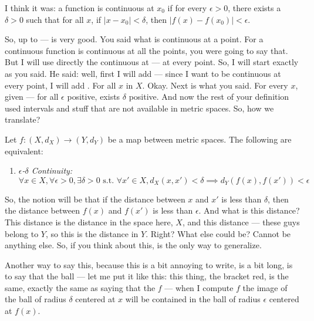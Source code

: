 \begin{student-interaction}
I think it was: a function is continuous at $x_0$ if for every $\epsilon > 0$, there exists a $\delta > 0$ such that for all $x$, if $|x - x_0| < \delta$, then $|f(x) - f(x_0)| < \epsilon$.
\end{student-interaction}

\begin{spoken-clean}[continued]
So, up to --- is very good. You said what is continuous at a point. For a continuous function is continuous at all the points, you were going to say that. But I will use directly the continuous at --- at every point. So, I will start exactly as you said. He said: well, first I will add --- since I want to be continuous at every point, I will add . For all $x$ in $X$. Okay. Next is what you said. For every $x$, given --- for all $\epsilon$ positive, exists $\delta$ positive. And now the rest of your definition used intervals and stuff that are not available in metric spaces. So, how we translate?
\end{spoken-clean}

\begin{math-stroke}
\setcounter{theorem}{52}
\begin{proposition}\label{prop:three-faces-continuity}
Let $f: (X, d_X) \to (Y, d_Y)$ be a map between metric spaces. The following are equivalent:
\begin{enumerate}
    \setcounter{enumi}{0} \item \emph{\texorpdfstring{$\epsilon$}{epsilon}-\texorpdfstring{$\delta$}{delta} Continuity:}
    \[ \forall x \in X, \forall \epsilon > 0, \exists \delta > 0 \text{ s.t. } \forall x' \in X, d_X(x, x') < \delta \implies d_Y(f(x), f(x')) < \epsilon \]
\end{enumerate}
\end{proposition}
\end{math-stroke}

\begin{spoken-clean}[00:08:23 - 00:10:23]
So, the notion will be that if the distance between $x$ and $x'$ is less than $\delta$, then the distance between $f(x)$ and $f(x')$ is less than $\epsilon$. And what is this distance? This distance is the distance in the space here, $X$, and this distance --- these guys belong to $Y$, so this is the distance in $Y$. Right? What else could be? Cannot be anything else. So, if you think about this, is the only way to generalize. 

Another way to say this, because this is a bit annoying to write, is a bit long, is to say that the ball --- let me put it like this: this thing, the bracket red, is the same, exactly the same as saying that the $f$ --- when I compute $f$ the image of the ball of radius $\delta$ centered at $x$ will be contained in the ball of radius $\epsilon$ centered at $f(x)$.
\end{spoken-clean}

